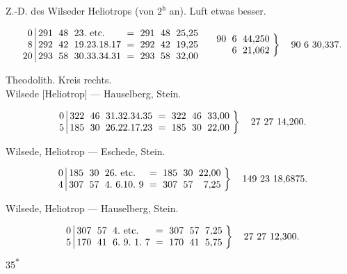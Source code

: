 \begin{center}
Z.-D. des Wilseder Heliotrops (von $2^{\mathrm h}$ an). Luft etwas besser.
\end{center}
\[
\setlength{\arraycolsep}{3pt}
\begin{array}{r|rrlcrrr}
0&291&48&23.\ \text{etc.}&=&291&48&25{,}25\\
8&292&42&19.23.18.17&=&292&42&19{,}25\\
20&293&58&30.33.34.31&=&293&58&32{,}00
\end{array}
\quad
\left.\begin{array}{rrr}
90&6&44{,}250\\&6&21{,}062
\end{array}\right\}\quad90\ 6\ 30{,}337.
\]
\begin{center}
Theodolith. Kreis rechts.\\[4pt]
Wilsede [Heliotrop] --- Hauselberg, Stein.
\end{center}
\[
\setlength{\arraycolsep}{3pt}
\left.\begin{array}{r|rrlcrrr}
0&322&46&31.32.34.35&=&322&46&33{,}00\\
5&185&30&26.22.17.23&=&185&30&22{,}00
\end{array}\right\}\quad27\ 27\ 14{,}200.
\]
\begin{center}Wilsede, Heliotrop --- Eschede, Stein.\end{center}
\[
\setlength{\arraycolsep}{3pt}
\left.\begin{array}{r|rrlcrrr}
0&185&30&26.\ \text{etc.}&=&185&30&22{,}00\\
4&307&57&4.\ 6.10.\ 9&=&307&57&7{,}25
\end{array}\right\}\quad149\ 23\ 18{,}6875.
\]
\begin{center}Wilsede, Heliotrop --- Hauselberg, Stein.\end{center}
\[
\setlength{\arraycolsep}{3pt}
\left.\begin{array}{r|rrlcrrr}
0&307&57&4.\ \text{etc.}&=&307&57&7{,}25\\
5&170&41&6.\ 9.\ 1.\ 7&=&170&41&5{,}75
\end{array}\right\}\quad27\ 27\ 12{,}300.
\]
\vfill\noindent\hfill35\textsuperscript{$\ast$}\hspace*{2cm}

